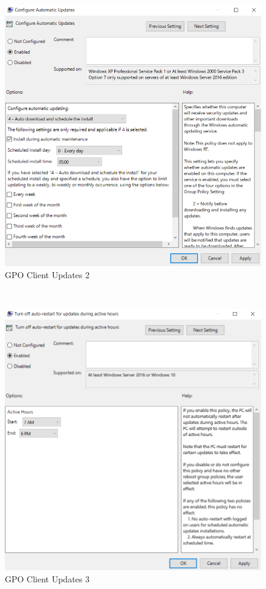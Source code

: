 \begin{minipage}{0.5\linewidth}
    \begin{figure}[H]
        \centering
        \includegraphics[width=\linewidth]{../img/Updates/client-configure-automatic-updates.png}
        \caption{GPO Client Updates 2}
    \end{figure}
\end{minipage}\\
\begin{minipage}{0.5\linewidth}
    \begin{figure}[H]
        \centering
        \includegraphics[width=\linewidth]{../img/Updates/client-auto-restart-during-working-hours.png}
        \caption{GPO Client Updates 3}
    \end{figure}
\end{minipage}
